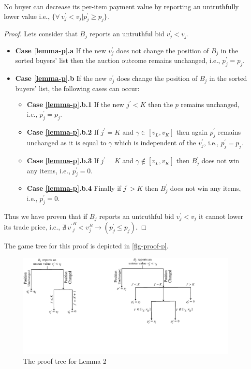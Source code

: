 \begin{Lemma}
\label{lemma-p}
No buyer can decrease its per-item payment value by reporting an untruthfully lower value i.e., $\{\forall \ v^\prime_j < v_j | p^\prime_{j} \geq p_{j} \}$.
\end{Lemma}
\begin{proof}
Lets consider that $B_j$ reports an untruthful bid $v^\prime_j < v_j$.
\begin{itemize}
    \item[] \textbf{Case \ref{lemma-p}.a} If the new $v^\prime_j$ does not change the position of $B_j$ in the sorted buyers' list then the auction outcome remains unchanged, i.e., $p^\prime_{j} = p_{j}$.
    \item[] \textbf{Case \ref{lemma-p}.b} If the new $v^\prime_j$ does change the position of $B_j$ in the sorted buyers' list, the following cases can occur:
    \begin{itemize}
    \item[] \textbf{Case \ref{lemma-p}.b.1} If the new $j^\prime < K$ then the $p$ remains unchanged, i.e., $p^\prime_{j} = p_{j}$.
    \item[] \textbf{Case \ref{lemma-p}.b.2} If $j^\prime = K$ and $\gamma \in [{v^{}_L}, {v^{}_K}]$ then again $p^\prime_{j}$ remains unchanged as it is equal to $\gamma$ which is independent of the $v^\prime_j$, i.e., $p^\prime_{j} = p_{j}$.
    \item[] \textbf{Case \ref{lemma-p}.b.3} If $j^\prime = K$ and $\gamma \notin [{v^{}_L} , {v^{}_K}]$ then $B^\prime_j$ does not win any items, i.e., $p^\prime_j=0$.
    \item[] \textbf{Case \ref{lemma-p}.b.4} Finally if $j^\prime > K$ then $B^\prime_j$ does not win any items, i.e., $p^\prime_j=0$.
    \end{itemize}
\end{itemize}
Thus we have proven that if $B_j$ reports an untruthful bid $v^\prime_j < v_j$ it cannot lower its trade price, i.e., $\nexists \ {{v^\prime}^B_{j} < v^B_{j}}\rightarrow ({p^\prime_{j}} \leq p_{j})$.
\end{proof}
The game tree for this proof is depicted in \autoref{fig-proof-p}.
\begin{figure}[htbp]
\centering
\includegraphics{Figures/proofp}
\caption{The proof tree for Lemma 2}
\label{fig-proof-p}
\vspace{-4mm}
\end{figure}
